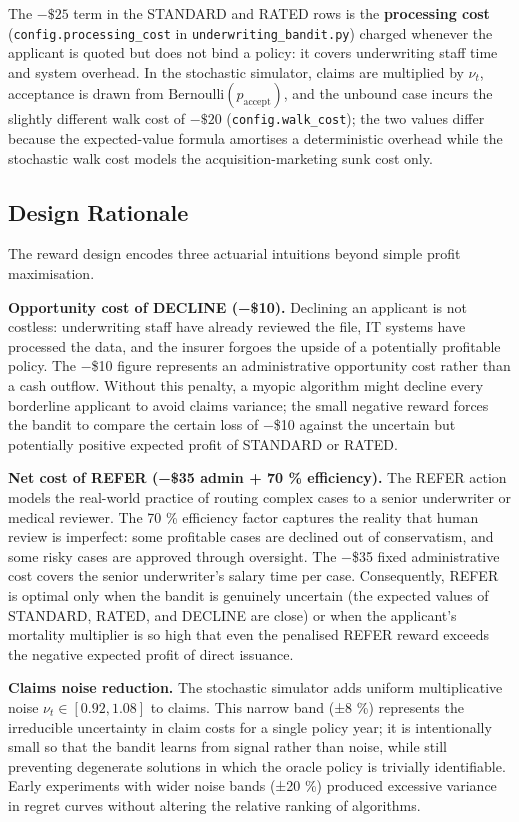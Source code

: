 The \(-\$25\) term in the STANDARD and RATED rows is the \textbf{processing cost} (\texttt{config.processing\_cost} in \texttt{underwriting\_bandit.py}) charged whenever the applicant is quoted but does not bind a policy: it covers underwriting staff time and system overhead. In the stochastic simulator, claims are multiplied by \(\nu_t\), acceptance is drawn from \(\text{Bernoulli}(p_{\text{accept}})\), and the unbound case incurs the slightly different walk cost of \(-\$20\) (\texttt{config.walk\_cost}); the two values differ because the expected-value formula amortises a deterministic overhead while the stochastic walk cost models the acquisition-marketing sunk cost only.

\subsection{Design Rationale}\label{design-rationale}

The reward design encodes three actuarial intuitions beyond simple profit maximisation.

\textbf{Opportunity cost of DECLINE (−\$10).} Declining an applicant is not costless: underwriting staff have already reviewed the file, IT systems have processed the data, and the insurer forgoes the upside of a potentially profitable policy. The −\$10 figure represents an administrative opportunity cost rather than a cash outflow. Without this penalty, a myopic algorithm might decline every borderline applicant to avoid claims variance; the small negative reward forces the bandit to compare the certain loss of −\$10 against the uncertain but potentially positive expected profit of STANDARD or RATED.

\textbf{Net cost of REFER (−\$35 admin + 70 \% efficiency).} The REFER action models the real-world practice of routing complex cases to a senior underwriter or medical reviewer. The 70 \% efficiency factor captures the reality that human review is imperfect: some profitable cases are declined out of conservatism, and some risky cases are approved through oversight. The −\$35 fixed administrative cost covers the senior underwriter's salary time per case. Consequently, REFER is optimal only when the bandit is genuinely uncertain (the expected values of STANDARD, RATED, and DECLINE are close) or when the applicant's mortality multiplier is so high that even the penalised REFER reward exceeds the negative expected profit of direct issuance.

\textbf{Claims noise reduction.} The stochastic simulator adds uniform multiplicative noise \(\nu_t \in [0.92, 1.08]\) to claims. This narrow band (±8 \%) represents the irreducible uncertainty in claim costs for a single policy year; it is intentionally small so that the bandit learns from signal rather than noise, while still preventing degenerate solutions in which the oracle policy is trivially identifiable. Early experiments with wider noise bands (±20 \%) produced excessive variance in regret curves without altering the relative ranking of algorithms.

